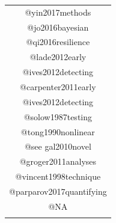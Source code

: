\documentclass[12pt,twoside,openany]{reedthesis}
\begin{document}
\begin{longtable}[]{@{}c@{}}
\begin{minipage}[t]{0.46\columnwidth}\centering
@yin2017methods\strut
\end{minipage}\tabularnewline
\begin{minipage}[t]{0.46\columnwidth}\centering
@jo2016bayesian\strut
\end{minipage}\tabularnewline
\begin{minipage}[t]{0.46\columnwidth}\centering
@qi2016resilience\strut
\end{minipage}\tabularnewline
\begin{minipage}[t]{0.46\columnwidth}\centering
@lade2012early\strut
\end{minipage}\tabularnewline
\begin{minipage}[t]{0.46\columnwidth}\centering
@ives2012detecting\strut
\end{minipage}\tabularnewline
\begin{minipage}[t]{0.46\columnwidth}\centering
@carpenter2011early\strut
\end{minipage}\tabularnewline
\begin{minipage}[t]{0.46\columnwidth}\centering
@ives2012detecting\strut
\end{minipage}\tabularnewline
\begin{minipage}[t]{0.46\columnwidth}\centering
@solow1987testing\strut
\end{minipage}\tabularnewline
\begin{minipage}[t]{0.46\columnwidth}\centering
@tong1990nonlinear\strut
\end{minipage}\tabularnewline
\begin{minipage}[t]{0.46\columnwidth}\centering
@see gal2010novel\strut
\end{minipage}\tabularnewline
\begin{minipage}[t]{0.46\columnwidth}\centering
@groger2011analyses\strut
\end{minipage}\tabularnewline
\begin{minipage}[t]{0.46\columnwidth}\centering
@vincent1998technique\strut
\end{minipage}\tabularnewline
\begin{minipage}[t]{0.46\columnwidth}\centering
@parparov2017quantifying\strut
\end{minipage}\tabularnewline
\begin{minipage}[t]{0.46\columnwidth}\centering
@NA\strut
\end{minipage}\tabularnewline
\begin{minipage}[t]{0.46\columnwidth}\centering

\end{minipage}
\end{longtable}
\end{document}
